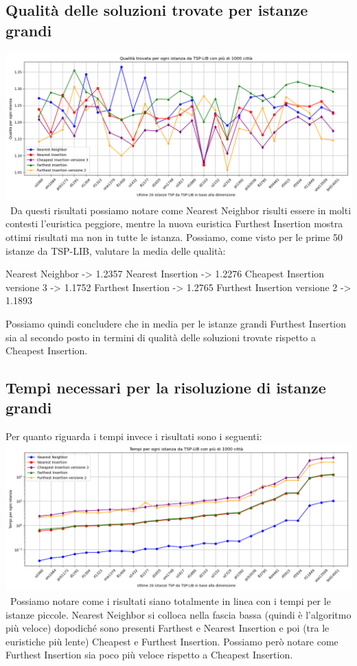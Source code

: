 \documentclass[a4paper,12pt]{report}
\begin{document}
\subsection{Qualità delle soluzioni trovate per istanze grandi}
\includegraphics[width=1\textwidth]{../Grafici/18.png} \
Da questi risultati possiamo notare come Nearest Neighbor risulti essere in molti contesti l'euristica peggiore, mentre la nuova euristica Furthest Insertion mostra ottimi risultati ma non in tutte le istanza. Possiamo, come visto per le prime 50 istanze da TSP-LIB, valutare la media delle qualità:
\begin{myverbatim}
Nearest Neighbor ->              1.2357
Nearest Insertion ->             1.2276
Cheapest Insertion versione 3 -> 1.1752
Farthest Insertion ->            1.2765
Furthest Insertion versione 2 -> 1.1893
\end{myverbatim}
Possiamo quindi concludere che in media per le istanze grandi Furthest Insertion sia al secondo posto in termini di qualità delle soluzioni trovate rispetto a Cheapest Insertion.
\subsection{Tempi necessari per la risoluzione di istanze grandi}
Per quanto riguarda i tempi invece i risultati sono i seguenti: \newline
\includegraphics[width=1\textwidth]{../Grafici/19.png} \
Possiamo notare come i risultati siano totalmente in linea con i tempi per le istanze piccole. Nearest Neighbor si colloca nella fascia bassa (quindi è l'algoritmo più veloce) dopodiché sono presenti Farthest e Nearest Insertion e poi (tra le euristiche più lente) Cheapest e Furthest Insertion. Possiamo però notare come Furthest Insertion sia poco più veloce rispetto a Cheapest Insertion.
\end{document}
